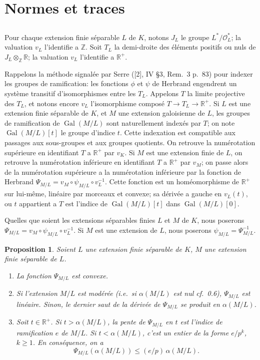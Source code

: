 \documentclass[12pt,a4paper]{article}
\theoremstyle{plain}
\newtheorem{proposition}[theorem]{Proposition}
\theoremstyle{definition}
\theoremstyle{remark}
\newcommand{\cO}{\mathcal{O}}
\newcommand{\bZ}{\mathbb{Z}}
\newcommand{\bR}{\mathbb{R}}
\providecommand{\cO}{\mathcal{O}}
\providecommand{\Gal}{\operatorname{Gal}}
\begin{document}
\section{Normes et traces}
\label{sec:3}

\subsection{}
\label{sec:3.1}

Pour chaque extension finie s\'eparable $L$ de $K$, notons $J_L$ le groupe $L^*/\cO_L^*$; la valuation $v_L$ l'identifie a $\bZ$. Soit $T_L$ la demi-droite des \'el\'ements positifs ou nuls de $J_L \otimes_\bZ \bR$; la valuation $v_L$ l'identifie a $\bR^+$.

Rappelons la m\'ethode signal\'ee par Serre ([2], IV \S 3, Rem.~3 p.~83) pour indexer les groupes de ramification: les fonctions $\phi$ et $\psi$ de Herbrand engendrent un syst\`eme transitif d'isomorphismes entre les $T_L$. Appelons $T$ la limite projective des $T_L$, et notons encore $v_L$ l'isomorphisme compos\'e $T \to T_L \to \bR^+$. Si $L$ est une extension finie s\'eparable de $K$, et $M$ une extension galoisienne de $L$, les groupes de ramification de $\Gal(M/L)$ sont naturellement index\'es par $T$; on note $\Gal(M/L)[t]$ le groupe d'indice $t$. Cette indexation est compatible aux passages aux sous-groupes et aux groupes quotients. On retrouve la num\'erotation sup\'erieure en identifiant $T$ a $\bR^+$ par $v_K$. Si $M$ est une extension finie de $L$, on retrouve la num\'erotation inf\'erieure en identifiant $T$ a $\bR^+$ par $v_M$; on passe alors de la num\'erotation sup\'erieure a la num\'erotation inf\'erieure par la fonction de Herbrand $\Psi_{M/L} = v_M \circ \psi_{M/L} \circ v_L^{-1}$. Cette fonction est un hom\'eomorphisme de $\bR^+$ sur lui-m\^eme, lin\'eaire par morceaux et convexe; sa d\'eriv\'ee a gauche en $v_L(t)$, ou $t$ appartient a $T$ est l'indice de $\Gal(M/L)[t]$ dans $\Gal(M/L)[0]$.

Quelles que soient les extensions s\'eparables finies $L$ et $M$ de $K$, nous poserons $\Psi_{M/L} = v_M \circ \psi_{M/L} \circ v_L^{-1}$. Si $M$ est une extension de $L$, nous poserons $\psi_{M/L} = \Psi_{M/L}^{-1}$.

\begin{proposition}\label{prop:3.2}
Soient $L$ une extension finie s\'eparable de $K$, $M$ une extension finie s\'eparable de $L$.
\begin{enumerate}[label=(\roman*)]
\item La fonction $\Psi_{M/L}$ est convexe.
\item Si l'extension $M/L$ est mod\'er\'ee (i.e.~si $\alpha(M/L)$ est nul cf.~0.6), $\Psi_{M/L}$ est lin\'eaire. Sinon, le dernier saut de la d\'eriv\'ee de $\Psi_{M/L}$ se produit en $\alpha(M/L)$.
\item Soit $t \in \bR^+$. Si $t > \alpha(M/L)$, la pente de $\Psi_{M/L}$ en $t$ est l'indice de ramification $e$ de $M/L$. Si $t < \alpha(M/L)$, c'est un entier de la forme $e/p^k$, $k \geq 1$. En cons\'equence, on a
\[
\Psi_{M/L}(\alpha(M/L)) \leq (e/p) \, \alpha(M/L).
\]
\end{enumerate}
\end{proposition}
\end{document}
